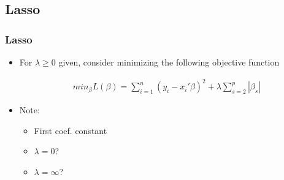 \documentclass[
  shownotes,
  xcolor={svgnames},
  hyperref={colorlinks,citecolor=DarkBlue,linkcolor=DarkRed,urlcolor=DarkBlue}
  , aspectratio=169]{beamer}
\begin{document}
\subsection{Lasso}
\begin{frame}[fragile]
\frametitle{Lasso}

\begin{itemize}
\item For $\lambda \geq 0$ given, consider minimizing the following objective function


\begin{align}
min_{\beta} L(\beta) = \sum_{i=1}^n (y_i-x_i'\beta)^2 + \lambda \sum_{s=2}^p |\beta_s| 
\end{align}

\bigskip
\item Note:
\begin{itemize}
  \item First coef. constant
  \pause
  \item $\lambda = 0$?
  \pause
  \item $\lambda = \infty$?
\end{itemize}
\end{itemize}
\end{frame}
\end{document}
